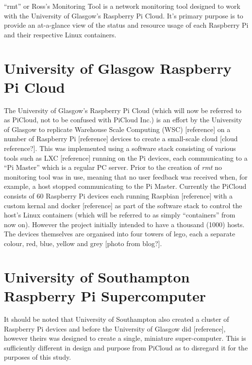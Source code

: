 ``rmt'' or Ross's Monitoring Tool is a network monitoring tool 
designed to work with the University of Glasgow's Raspberry Pi 
Cloud. It's primary purpose is to provide an at-a-glance view of the 
status and resource usage of each Raspberry Pi and their respective 
Linux containers.

\section{University of Glasgow Raspberry Pi Cloud}
\label{intro:picloud}

The University of Glasgow's Raspberry Pi Cloud \cite{glapicloud} (which will now be referred to as PiCloud, not to be confused with PiCloud Inc.) is an effort by the University of Glasgow to replicate Warehouse Scale Computing (WSC) [reference] on a number of Raspberry Pi [reference] devices to create a small-scale cloud [cloud reference?].
This was implemented using a software stack consisting of various tools such as LXC [reference] running on the Pi devices, each communicating to a ``Pi Master'' which is a regular PC server.
Prior to the creation of \emph{rmt} no monitoring tool was in use, meaning that no user feedback was received when, for example, a host stopped communicating to the Pi Master.
Currently the PiCloud consists of 60 Raspberry Pi devices each running Raspbian [reference] with a custom kernal and docker [reference] as part of the software stack to control the host's Linux containers (which will be referred to as simply ``containers'' from now on).
However the project initially intended to have a thousand (1000) hosts.
The devices themselves are organised into four towers of lego, each a separate colour, red, blue, yellow and grey [photo from blog?].

\section{University of Southampton Raspberry Pi Supercomputer}
\label{intro:pisupercomp}

It should be noted that University of Southampton also created a cluster of Raspberry Pi devices and before the University of Glasgow did [reference], however theirs was designed to create a single, miniature super-computer.
This is sufficiently different in design and purpose from PiCloud as to disregard it for the purposes of this study.